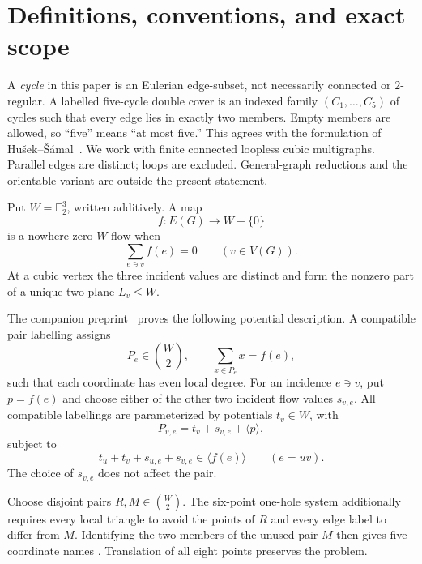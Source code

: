 \documentclass[11pt]{article}
\theoremstyle{definition}
\theoremstyle{remark}
\newcommand{\F}{\mathbb F}
\numberwithin{equation}{section}
\begin{document}
\section{Definitions, conventions, and exact scope}

A \emph{cycle} in this paper is an Eulerian edge-subset, not necessarily
connected or \(2\)-regular.  A labelled five-cycle double cover is an
indexed family \((C_1,\ldots,C_5)\) of cycles such that every edge lies
in exactly two members.  Empty members are allowed, so ``five'' means
``at most five.''  This agrees with the formulation of
Hu\v{s}ek--\v{S}\'amal~\cite[Definition~1.2]{HusekSamal2026}.
We work with finite connected loopless cubic multigraphs.  Parallel
edges are distinct; loops are excluded.  General-graph reductions and
the orientable variant are outside the present statement.

Put \(W=\F_2^3\), written additively.  A map
\[
                      f:E(G)\longrightarrow W-\{0\}
\]
is a nowhere-zero \(W\)-flow when
\[
                      \sum_{e\ni v}f(e)=0
                      \qquad(v\in V(G)).
\]
At a cubic vertex the three incident values are distinct and form the
nonzero part of a unique two-plane \(L_v\le W\).

The companion preprint~\cite{VaidyaSixPoint2026} proves the following
potential description.  A compatible pair labelling assigns
\[
                       P_e\in\binom W2,\qquad
                       \sum_{x\in P_e}x=f(e),
\]
such that each coordinate has even local degree.  For an incidence
\(e\ni v\), put \(p=f(e)\) and choose either of the other two incident
flow values \(s_{v,e}\).  All compatible labellings are parameterized
by potentials \(t_v\in W\), with
\begin{equation}
 P_{v,e}=t_v+s_{v,e}+\langle p\rangle,                       \label{eq:side}
\end{equation}
subject to
\begin{equation}
 t_u+t_v+s_{u,e}+s_{v,e}\in\langle f(e)\rangle
 \qquad(e=uv).                                               \label{eq:edgecompat}
\end{equation}
The choice of \(s_{v,e}\) does not affect the pair.

Choose disjoint pairs \(R,M\in\binom W2\).  The six-point one-hole
system additionally requires every local triangle to avoid the points
of \(R\) and every edge label to differ from \(M\).  Identifying the two
members of the unused pair \(M\) then gives five coordinate names
\cite{VaidyaSixPoint2026}.  Translation of all eight points preserves
the problem.
\end{document}
